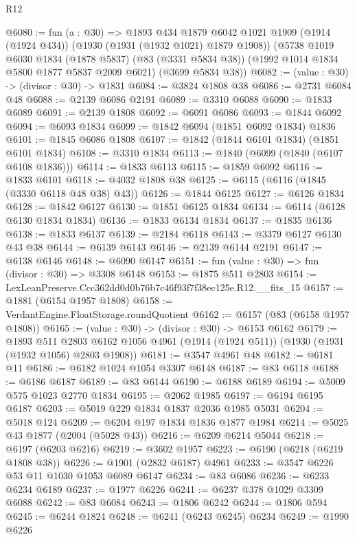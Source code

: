 \begin{lexlean}{R12}
\begin{coremodule}
@6080 := fun (a : @30) =>
  @1893
    @434
    @1879
    @6042
    @1021
    @1909
    (@1914 (@1924 @434))
    (@1930 (@1931 (@1932 @1021) @1879 @1908))
    (@5738
      @1019
      @6030
      @1834
      (@1878 @5837)
      (@83 (@3331 @5834 @38))
      (@1992 @1014 @1834 @5800 @1877 @5837 @2009 @6021)
      (@3699 @5834 @38))
@6082 := (value : @30) -> (divisor : @30) -> @1831
@6084 := @3824 @1808 @38
@6086 := @2731 @6084 @48
@6088 := @2139 @6086 @2191
@6089 := @3310 @6088
@6090 := @1833 @6089
@6091 := @2139 @1808
@6092 := @6091 @6086
@6093 := @1844 @6092
@6094 := @6093 @1834
@6099 := @1842 @6094 (@1851 @6092 @1834) @1836
@6101 := @1845 @6086 @1808
@6107 := @1842 (@1844 @6101 @1834) (@1851 @6101 @1834)
@6108 := @3310 @1834
@6113 := @1840 (@6099 (@1840 (@6107 @6108 @1836)))
@6114 := @1833 @6113
@6115 := @1859 @6092
@6116 := @1833 @6101
@6118 := @4032 @1808 @38
@6125 := @6115 (@6116 (@1845 (@3330 @6118 @48 @38) @43))
@6126 := @1844 @6125
@6127 := @6126 @1834
@6128 := @1842 @6127
@6130 := @1851 @6125 @1834
@6134 := @6114 (@6128 @6130 @1834 @1834)
@6136 := @1833 @6134 @1834
@6137 := @1835 @6136
@6138 := @1833 @6137
@6139 := @2184 @6118
@6143 := @3379 @6127 @6130 @43 @38
@6144 := @6139 @6143
@6146 := @2139 @6144 @2191
@6147 := @6138 @6146
@6148 := @6090 @6147
@6151 := fun (value : @30) => fun (divisor : @30) => @3308 @6148
@6153 := @1875 @511 @2803
@6154 := LexLeanPreserve.Ccc362dd0d0b76b7c46f93f7f38ec125e.R12.__fits_15
@6157 := @1881 (@6154 @1957 @1808)
@6158 := VerdantEngine.FloatStorage.roundQuotient
@6162 := @6157 (@83 (@6158 @1957 @1808))
@6165 := (value : @30) -> (divisor : @30) -> @6153 @6162
@6179 := @1893
    @511
    @2803
    @6162
    @1056
    @4961
    (@1914 (@1924 @511))
    (@1930 (@1931 (@1932 @1056) @2803 @1908))
@6181 := @3547 @4961 @48
@6182 := @6181 @11
@6186 := @6182 @1024 @1054 @3307 @6148
@6187 := @83 @6118
@6188 := @6186 @6187
@6189 := @83 @6144
@6190 := @6188 @6189
@6194 := @5009 @575 @1023 @2770 @1834
@6195 := @2062 @1985
@6197 := @6194 @6195 @6187
@6203 := @5019 @229 @1834 @1837 @2036 @1985 @5031
@6204 := @5018 @124
@6209 := @6204 @197 @1834 @1836 @1877 @1984
@6214 := @5025 @43 @1877 (@2004 (@5028 @43))
@6216 := @6209 @6214 @5044
@6218 := @6197 (@6203 @6216)
@6219 := @3602 @1957
@6223 := @6190 (@6218 (@6219 @1808 @38))
@6226 := @1901 (@2832 @6187) @4961
@6233 := @3547 @6226 @53 @11 @1030 @1053 @6089 @6147
@6234 := @83 @6086
@6236 := @6233 @6234 @6189
@6237 := @1977 @6226
@6241 := @6237 @378 @1029 @3309 @6088
@6242 := @83 @6084
@6243 := @1806 @6242
@6244 := @1806 @594
@6245 := @6244 @1824
@6248 := @6241 (@6243 @6245) @6234
@6249 := @1990 @6226

\end{coremodule}
\end{lexlean}

